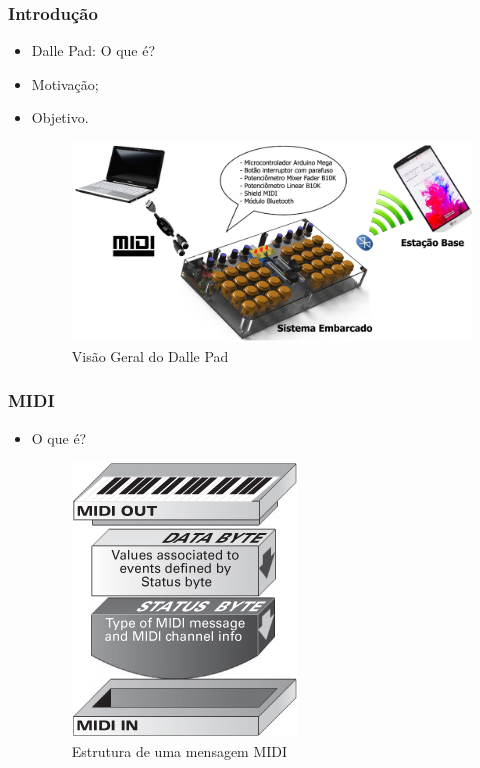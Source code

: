 \documentclass[hyperref={pdfpagelabels=false}]{beamer}
\begin{document}
            \begin{frame}\frametitle{Introdução}

                \begin{itemize}
                  \item Dalle Pad: O que é?
                  \item Motivação;
                  \item Objetivo.
                        \begin{figure}[H]
                        	\centering
                        	\includegraphics[scale=0.1]{Imagens/imagem-geral-(Fundo-Branco).png}
                        	\caption[Visão Geral do Dalle Pad]{Visão Geral do Dalle Pad}
                        	\label{fig:visao-geral}
                        \end{figure}
                \end{itemize}

            \end{frame}

            \begin{frame}\frametitle{MIDI}

                \begin{itemize}

                  \item O que é?
                        \begin{figure}[H]
                        	\centering
                        	\includegraphics[scale=0.6]{Imagens/Status_and_Data_Bytes.jpg}
                        	\caption[Estrutura de uma mensagem MIDI]{Estrutura de uma mensagem MIDI}
                        	\label{fig:estrutura-midi}
                        \end{figure}
                \end{itemize}

            \end{frame}
\end{document}
